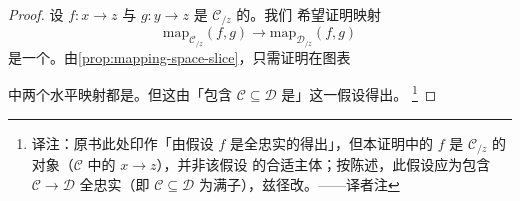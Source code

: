 \begin{proof}
设 $f\colon x \to z$ 与 $g\colon y \to z$ 是 $\mathcal{C}_{/z}$ 的\trObject{}。我们
希望证明映射
\[
\mathrm{map}_{\mathcal{C}_{/z}}(f, g) \to
\mathrm{map}_{\mathcal{D}_{/z}}(f, g)
\]
是一个\trHomotopyEquivalence{}。由\cref{prop:mapping-space-slice}，只需证明在图表
\begin{center}
\end{center}
中两个水平映射都是\trEquivalence{}。但这由「包含
$\mathcal{C} \subseteq \mathcal{D}$ 是\trFullyFaithful{}」这一假设得出。%
\footnote{译注：原书此处印作「由假设 $f$ 是全忠实的得出」，但本证明中的 $f$ 是
$\mathcal{C}_{/z}$ 的对象（$\mathcal{C}$ 中的\trMorphism{} $x \to z$），并非该假设
的合适主体；按陈述，此假设应为包含 $\mathcal{C} \to \mathcal{D}$ 全忠实（即
$\mathcal{C} \subseteq \mathcal{D}$ 为满子\trCategory{}），兹径改。——译者注}
\end{proof}
